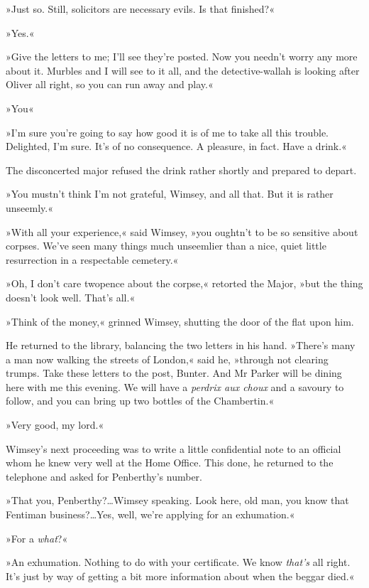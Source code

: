 »Just so. Still, solicitors are necessary evils. Is that finished?«

»Yes.«

»Give the letters to me; I'll see they're posted. Now you needn't worry any more about it. Murbles and I will see to it all, and the detective-wallah is looking after Oliver all right, so you can run away and play.«

»You\longdash«

»I'm sure you're going to say how good it is of me to take all this trouble. Delighted, I'm sure. It's of no consequence. A pleasure, in fact. Have a drink.«

The disconcerted major refused the drink rather shortly and prepared to depart.

»You mustn't think I'm not grateful, Wimsey, and all that. But it is rather unseemly.«

»With all your experience,« said Wimsey, »you oughtn't to be so sensitive about corpses. We've seen many things much unseemlier than a nice, quiet little resurrection in a respectable cemetery.«

»Oh, I don't care twopence about the corpse,« retorted the Major, »but the thing doesn't look well. That's all.«

»Think of the money,« grinned Wimsey, shutting the door of the flat upon him.

He returned to the library, balancing the two letters in his hand. »There's many a man now walking the streets of London,« said he, »through not clearing trumps. Take these letters to the post, Bunter. And Mr Parker will be dining here with me this evening. We will have a \textit{perdrix aux choux} and a savoury to follow, and you can bring up two bottles of the Chambertin.«

»Very good, my lord.«

Wimsey's next proceeding was to write a little confidential note to an official whom he knew very well at the Home Office. This done, he returned to the telephone and asked for Penberthy's number.

»That you, Penberthy?\dots Wimsey speaking\textellipsis. Look here, old man, you know that Fentiman business?\dots Yes, well, we're applying for an exhumation.«

»For a \textit{what}?«

»An exhumation. Nothing to do with your certificate. We know \textit{that's} all right. It's just by way of getting a bit more information about when the beggar died.«

